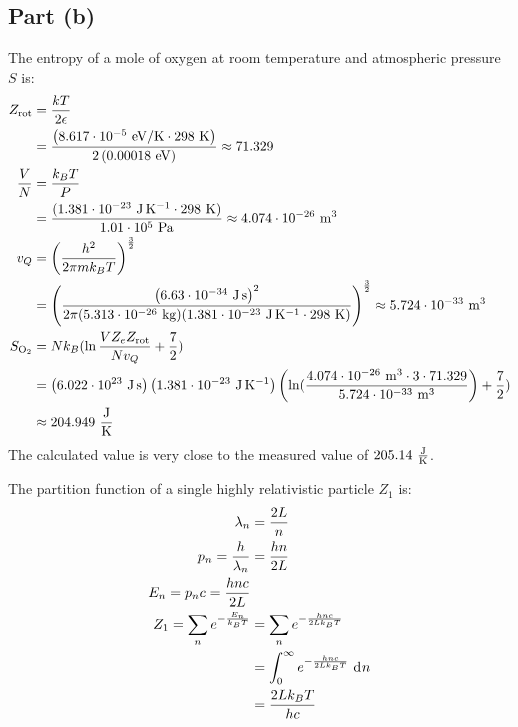 \documentclass{article}
\begin{document}
\subsection*{Part (b)}
The entropy of a mole of oxygen at room temperature and atmospheric pressure $S$ is:
\begin{equation}
    \begin{split}
        Z_{\text{rot}} & = \frac{kT}{2\epsilon} \\
        & = \frac{\left(8.617 \cdot 10^{-5}~\unit{eV\per\kelvin} \cdot 298~\unit{\kelvin}\right)}{2\left(0.00018~\unit{eV}\right)} \approx 71.329 \\
        \frac{V}{N} & = \frac{k_BT}{P} \\
        & = \frac{(1.381 \cdot 10^{-23}~\unit{\joule\per\kelvin} \cdot 298~\unit{\kelvin})}{1.01 \cdot 10^5~\unit{\pascal}} \approx 4.074 \cdot 10^{-26}~\unit{\meter\cubed} \\
        v_Q & = {\left(\frac{h^2}{2\pi mk_BT}\right)}^{\frac{3}{2}} \\
        & = {\left(\frac{{\left(6.63 \cdot 10^{-34}~\unit{\joule\second}\right)}^2}{2\pi (5.313 \cdot 10^{-26}~\unit{\kilogram})(1.381 \cdot 10^{-23}~\unit{\joule\per\kelvin} \cdot 298~\unit{\kelvin})}\right)}^{\frac{3}{2}} \approx 5.724 \cdot 10^{-33}~\unit{\meter\cubed} \\
        S_{\ce{O2}} & = Nk_B(\ln\frac{VZ_eZ_{\text{rot}}}{Nv_Q} + \frac{7}{2}) \\
        & = \left(6.022 \cdot 10^{23}~\unit{\joule\second}\right)\left(1.381 \cdot 10^{-23}~\unit{\joule\per\kelvin}\right)\left(\ln(\frac{4.074 \cdot 10^{-26}~\unit{\meter\cubed}\cdot 3 \cdot 71.329}{5.724 \cdot 10^{-33}~\unit{\meter\cubed}}\right) + \frac{7}{2}) \\
        & \approx 204.949~\unit{\frac{\joule}{\kelvin}}
    \end{split}
\end{equation}
The calculated value is very close to the measured value of $205.14~\unit{\frac{\joule}{\kelvin}}$.

\clearpage

The partition function of a single highly relativistic particle $Z_1$ is:
\begin{equation}
    \begin{split}
        \lambda_n & = \frac{2L}{n} \\
        p_n = \frac{h}{\lambda_n} & = \frac{hn}{2L} \\
        E_n = p_nc = \frac{hnc}{2L} \\
        Z_1 = \sum_n e^{-\frac{E_n}{k_BT}} & = \sum_n e^{-\frac{hnc}{2Lk_BT}} \\
        & = \int_0^{\infty} e^{-\frac{hnc}{2Lk_BT}} \, \diff{n} \\
        & = \frac{2Lk_BT}{hc}
    \end{split}
\end{equation}
\end{document}
